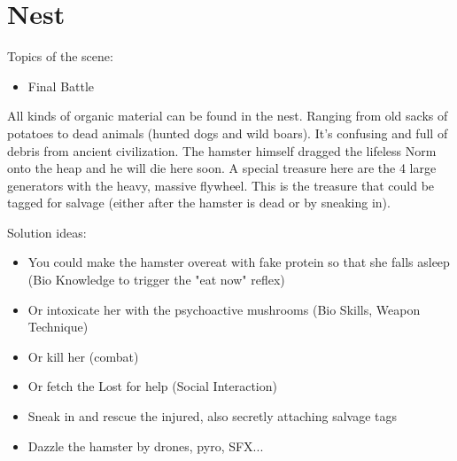 \section{Nest}

Topics of the scene:
\begin{itemize}
\item Final Battle
\end{itemize}

All kinds of organic material can be found in the nest. Ranging from old sacks of potatoes to dead animals (hunted dogs and wild boars).
It's confusing and full of debris from ancient civilization.
The hamster himself dragged the lifeless Norm onto the heap and he will die here soon.
A special treasure here are the 4 large generators with the heavy, massive flywheel. This is the treasure that could be tagged for salvage (either after the hamster is dead or by sneaking in). 

Solution ideas:
\begin{itemize}
\item You could make the hamster overeat with fake protein so that she falls asleep (Bio
Knowledge to trigger the "eat now" reflex)
\item Or intoxicate her with the psychoactive mushrooms (Bio Skills, Weapon Technique)
\item Or kill her (combat)
\item Or fetch the Lost for help (Social Interaction)
\item Sneak in and rescue the injured, also secretly attaching salvage tags
\item Dazzle the hamster by drones, pyro, SFX...
\end{itemize}


